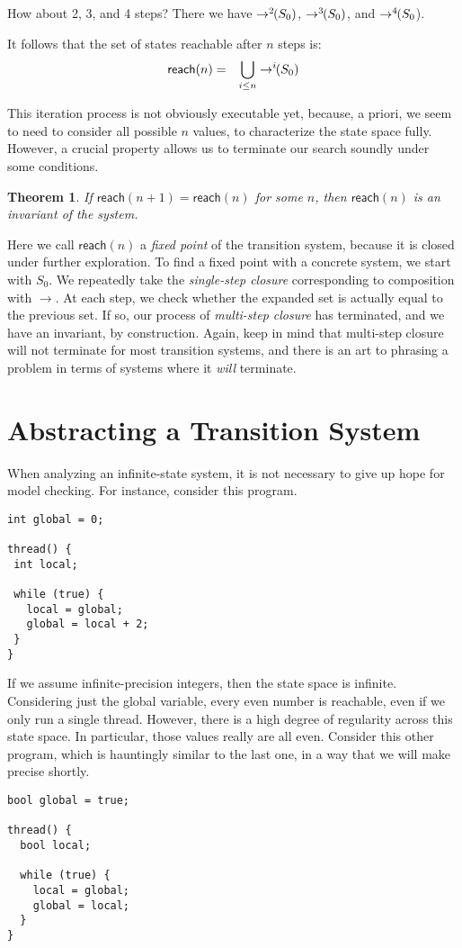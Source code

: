 \documentclass{amsbook}
\newtheorem{theorem}{Theorem}[chapter]
\theoremstyle{definition}
\theoremstyle{remark}
\numberwithin{section}{chapter}
\numberwithin{equation}{chapter}
\begin{document}
How about 2, 3, and 4 steps?
There we have $\to^2\ns(S_0)$, $\to^3\ns(S_0)$, and $\to^4\ns(S_0$).

It follows that the set of states reachable after $n$ steps is:
\begin{eqnarray*}
  \mathsf{reach}(n) &=& \bigcup_{i \leq n} \to^i\ns(S_0)
\end{eqnarray*}

This iteration process is not obviously executable yet, because, a priori, we seem to need to consider all possible $n$ values, to characterize the state space fully.
However, a crucial property allows us to terminate our search soundly under some conditions.

\begin{theorem}
  \invariants
  If $\mathsf{reach}(n+1) = \mathsf{reach}(n)$ for some $n$, then $\mathsf{reach}(n)$ is an invariant of the system.
\end{theorem}

Here we call $\mathsf{reach}(n)$ a \emph{fixed point} of the transition system, because it is closed under further exploration.
To find a fixed point with a concrete system, we start with $S_0$.
We repeatedly take the \emph{single-step closure} corresponding to composition with $\to$.
At each step, we check whether the expanded set is actually equal to the previous set.
If so, our process of \emph{multi-step closure} has terminated, and we have an invariant, by construction.
Again, keep in mind that multi-step closure will not terminate for most transition systems, and there is an art to phrasing a problem in terms of systems where it \emph{will} terminate.


\section{\label{trs_simulation}Abstracting a Transition System}

When analyzing an infinite-state system, it is not necessary to give up hope for model checking.
For instance, consider this program.
\begin{verbatim}
int global = 0;

thread() {
 int local;

 while (true) {
   local = global;
   global = local + 2;
 }
}
\end{verbatim}

If we assume infinite-precision integers, then the state space is infinite.
Considering just the global variable, every even number is reachable, even if we only run a single thread.
However, there is a high degree of regularity across this state space.
In particular, those values really are all even.
Consider this other program, which is hauntingly similar to the last one, in a way that we will make precise shortly.
\begin{verbatim}
bool global = true;

thread() {
  bool local;

  while (true) {
    local = global;
    global = local;
  }
}
\end{verbatim}
\end{document}
